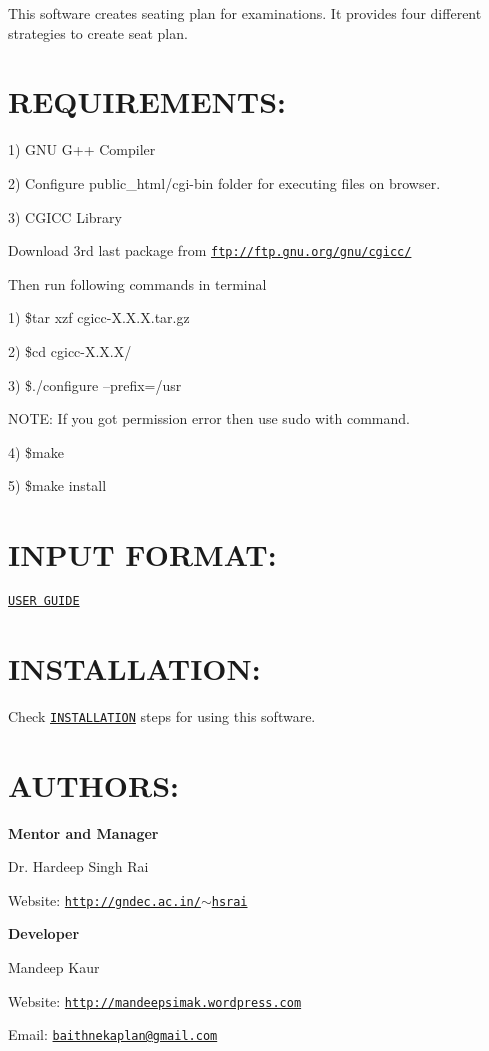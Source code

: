 This software creates seating plan for examinations. It provides four different strategies to create seat plan.

\section*{R\-E\-Q\-U\-I\-R\-E\-M\-E\-N\-T\-S\-:}

1) G\-N\-U G++ Compiler

2) Configure public\-\_\-html/cgi-\/bin folder for executing files on browser.

3) C\-G\-I\-C\-C Library\par
 Download 3rd last package from \href{ftp://ftp.gnu.org/gnu/cgicc/}{\tt ftp\-://ftp.\-gnu.\-org/gnu/cgicc/}\par


Then run following commands in terminal

1) \$tar xzf cgicc-\/\-X.\-X.\-X.\-tar.\-gz

2) \$cd cgicc-\/\-X.\-X.\-X/

3) \$./configure --prefix=/usr

N\-O\-T\-E\-: If you got permission error then use sudo with command.

4) \$make

5) \$make install

\section*{I\-N\-P\-U\-T F\-O\-R\-M\-A\-T\-:}

\href{https://github.com/GreatDevelopers/bakaplan/blob/master/USER%20GUIDE}{\tt U\-S\-E\-R G\-U\-I\-D\-E}

\section*{I\-N\-S\-T\-A\-L\-L\-A\-T\-I\-O\-N\-:}

Check \href{https://github.com/GreatDevelopers/bakaplan/blob/master/INSTALLATION}{\tt I\-N\-S\-T\-A\-L\-L\-A\-T\-I\-O\-N} steps for using this software.

\section*{A\-U\-T\-H\-O\-R\-S\-:}

{\bfseries Mentor and Manager}

Dr. Hardeep Singh Rai

Website\-: \href{http://gndec.ac.in/~hsrai}{\tt http\-://gndec.\-ac.\-in/$\sim$hsrai}

{\bfseries Developer}

Mandeep Kaur

Website\-: \href{http://mandeepsimak.wordpress.com}{\tt http\-://mandeepsimak.\-wordpress.\-com}

Email\-: \href{mailto:baithnekaplan@gmail.com}{\tt baithnekaplan@gmail.\-com} 